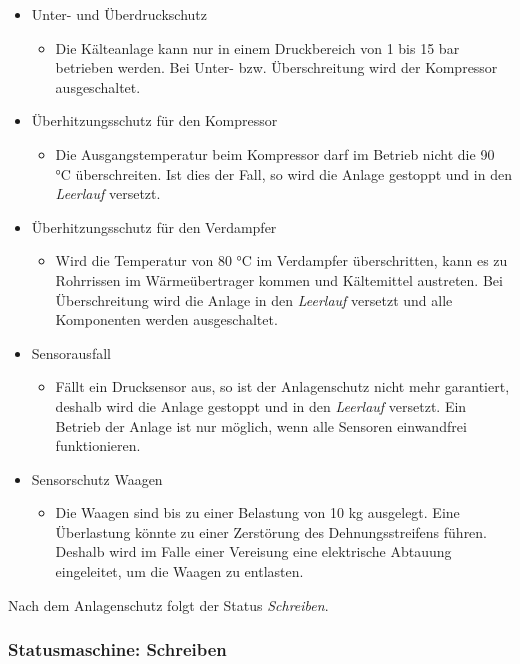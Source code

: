 \begin{itemize}
\item Unter- und Überdruckschutz
	\begin{itemize}
		\item Die Kälteanlage kann nur in einem Druckbereich von 1 bis 15 		bar betrieben werden. Bei Unter- bzw. Überschreitung 				wird der Kompressor ausgeschaltet. 
	\end{itemize}
\item Überhitzungsschutz für den Kompressor
	\begin{itemize}
		\item Die Ausgangstemperatur beim Kompressor darf im 						Betrieb nicht die 90 °C überschreiten. Ist dies 					der Fall, so wird die Anlage gestoppt und in den 				\textit{Leerlauf} versetzt. 
	\end{itemize}
\item Überhitzungsschutz für den Verdampfer
	\begin{itemize}
		\item Wird die Temperatur von 80 °C  im Verdampfer 						überschritten, kann es zu Rohrrissen im 							Wärmeübertrager kommen und Kältemittel austreten. 					Bei Überschreitung wird die Anlage in den 							\textit{Leerlauf} versetzt und alle Komponenten werden					ausgeschaltet. 
	\end{itemize}
\item Sensorausfall
	\begin{itemize}
		\item Fällt ein Drucksensor aus, so ist der 						Anlagenschutz nicht mehr garantiert, deshalb wird die 				Anlage gestoppt und in den \textit{Leerlauf} versetzt. 				Ein Betrieb der Anlage ist nur möglich, wenn alle 					Sensoren einwandfrei funktionieren.  
	\end{itemize}
\item Sensorschutz Waagen
	\begin{itemize}
		\item Die Waagen sind bis zu einer Belastung von 10 kg ausgelegt. Eine Überlastung könnte zu einer Zerstörung des Dehnungsstreifens führen. Deshalb wird im Falle einer Vereisung eine elektrische Abtauung eingeleitet, um die Waagen zu entlasten. 
	\end{itemize}
\end{itemize} 

Nach dem Anlagenschutz folgt der Status \textit{Schreiben}.


\subsubsection*{Statusmaschine: Schreiben}

